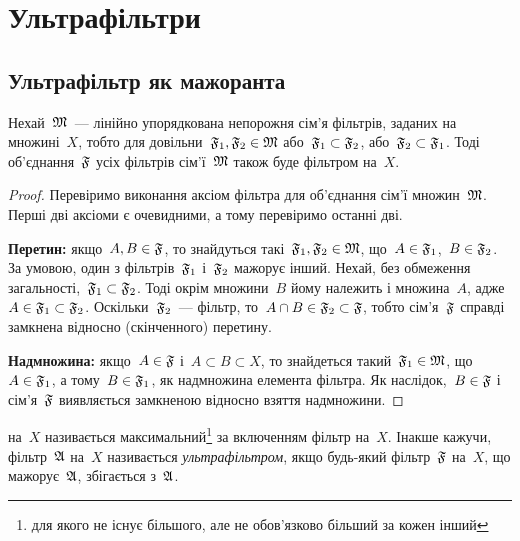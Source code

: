 \chapter{Ультрафільтри}

\section{Ультрафільтр як мажоранта} %

\begin{lemma}
    \label{lem:linear-filter-set-upper-bound}
    Нехай~$\frak M$~--- лінійно упорядкована непорожня сім'я фільтрів, заданих на множині~$X$, тобто для довільни~$\frak F_1, \frak F_2 \in \frak M$ або~$\frak F_1 \subset \frak F_2$, або~$\frak F_2 \subset \frak F_1$.  Тоді об'єднання~$\frak F$ усіх фільтрів сім'ї~$\frak M$ також буде фільтром на~$X$.
\end{lemma}
\begin{proof}
    Перевіримо виконання аксіом фільтра для об'єднання сім'ї множин~$\frak M$. Перші дві аксіоми є очевидними, а тому перевіримо останні дві. 
    
    \textbf{Перетин:} якщо~$A, B \in \frak F$, то знайдуться такі~$\frak F_1, \frak F_2 \in \frak M$, що~$A \in \frak F_1$,~$B \in \frak F_2$. За умовою, один з фільтрів~$\frak F_1$ і~$\frak F_2$ мажорує інший. Нехай, без обмеження загальності,~$\frak F_1 \subset \frak F_2$.  Тоді окрім множини~$B$ йому належить і множина~$A$, адже~$A \in \frak F_1 \subset \frak F_2$. Оскільки~$\frak F_2$~--- фільтр, то~$A \cap B \in \frak F_2 \subset \frak F$, тобто сім'я~$\frak F$ справді замкнена відносно (скінченного) перетину. 
    
    \textbf{Надмножина:} якщо~$A \in \frak F$ і~$A \subset B \subset X$, то знайдеться такий~$\frak F_1 \in \frak M$, що~$A \in \frak F_1$, а тому~$B \in \frak F_1$, як надмножина елемента фільтра.  Як наслідок,~$B \in \frak F$ і сім'я~$\frak F$ виявляється замкненою відносно взяття надмножини.
\end{proof}

\begin{definition}
     на~$X$ називається максимальний\footnote{для якого не існує більшого, але не обов'язково більший за кожен інший} за включенням фільтр на~$X$.  Інакше кажучи, фільтр~$\frak A$ на~$X$ називається \emph{ультрафільтром}, якщо будь-який фільтр~$\frak F$ на~$X$, що мажорує~$\frak A$, збігається з~$\frak A$.
\end{definition}

